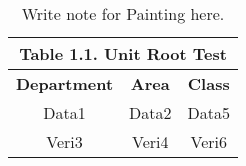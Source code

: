 \documentclass[10pt,a4paper]{article}
\begin{document}
\begin{table}[h!]
	
	\centering
	
	\caption{Write note for Painting here.}
	\label{Table2}
	
	\begin{tabular}{|c|c|c|}
		
		\multicolumn{3}{c}{\textbf{Table 1.1. Unit Root Test}} \\[1ex]
		
		
		\hline
		\textbf{Department} & \textbf{Area} & \textbf{Class} \\ \cline{1-3}
		\hline
		Data1 & Data2 & Data5 \\
		\hline
		Veri3 & Veri4 & Veri6 \\ \hline
		
	\end{tabular}
	
	
\end{table}




	
\end{document}
